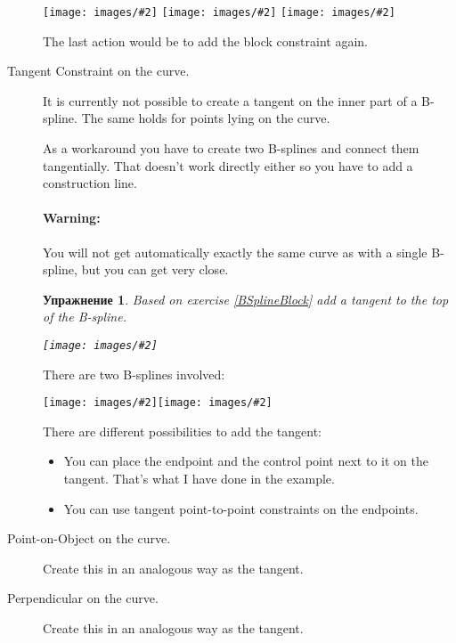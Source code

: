 \documentclass[12pt,titlepage]{article}
\newcommand{\iconSmall}[1]{\raisebox{-2ex}{\texttt{[image: images/\#1]}}}
\newcommand{\img}[2]{\vspace{2ex}\noindent\texttt{[image: images/\#2]}}
\newtheorem{Exercise}{Упражнение}
\begin{document}
\begin{description}
\hspace*{-\leftmargini}\img{scale=1}{BSplineTangent}%
\hfill%
\raisebox{1cm}{$\stackrel{\iconSmall{Constraint_Tangent}}{\longrightarrow}$}%
\hfill%
\img{scale=1}{BSplinePerpendicular}%
\hfill%
\raisebox{1cm}{$\stackrel{\iconSmall{Constraint_Perpendicular}}{\longrightarrow}$}
\hfill%
\img{scale=1}{BSplineTangentPerpendicular}%

The last action would be to add the block constraint again.


\item [Tangent Constraint on the curve.] It is currently not
      possible to create a tangent on the inner part of a B-spline. The same
      holds for points lying on the curve.
      
      As a workaround you have to create two B-splines and connect them
      tangentially. That doesn't work directly either so you have to add a
      construction line.
      
      \paragraph{Warning:} You will not get automatically exactly the same
      curve as with a single B-spline, but you can get very close.

\begin{Exercise}
Based on exercise \vref{BSplineBlock} add a tangent to the top of the B-spline.

\img{}{BSplineInnerTangentAll}
\end{Exercise}

There are two B-splines involved:

\img{width=0.43\textwidth}{BSplineInnerTangentLeft}\hfill\raisebox{15ex}{and}\hfill\img{width=0.43\textwidth}{BSplineInnerTangentRight}

There are different possibilities to add the tangent:
\begin{itemize}
\item You can place the endpoint and the control point next to it on the
      tangent. That's what I have done in the example.
\item You can use tangent point-to-point constraints on the endpoints.
\end{itemize}

\item [Point-on-Object on the curve.] Create this in an analogous way as the tangent.
\item [Perpendicular on the curve.]   Create this in an analogous way as the tangent.
\end{description}
\end{document}

